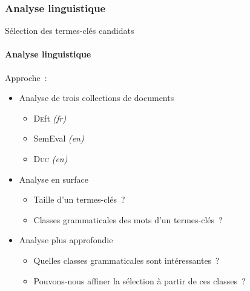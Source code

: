 \subsubsection{Analyse linguistique}
  \begin{frame}{Sélection des termes-clés candidats}\framesubtitle{Analyse linguistique}
    Approche~:
    \begin{itemize}
      \item<+->{Analyse de trois collections de documents}
      \begin{itemize}
        \item{\textsc{De}ft \textit{(fr)}}
        \item{SemEval \textit{(en)}}
        \item{\textsc{Duc} \textit{(en)}}
      \end{itemize}
      \item<+->{Analyse en surface}
      \begin{itemize}
        \item{Taille d'un termes-clés~?}
        \item{Classes grammaticales des mots d'un termes-clés~?}
      \end{itemize}
      \item<+->{Analyse plus approfondie}
      \begin{itemize}
        \item{Quelles classes grammaticales sont intéressantes~?}
        \item{Pouvons-nous affiner la sélection à partir de ces classes~?}
      \end{itemize}
    \end{itemize}
  \end{frame}
